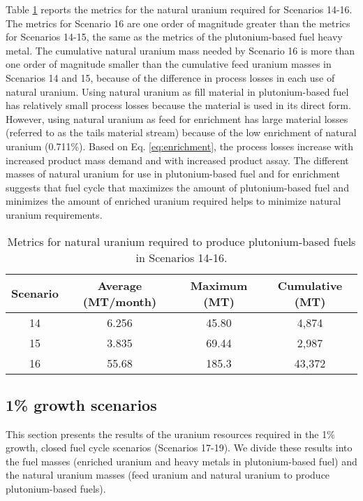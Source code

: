 Table \ref{tab:s14-16_natU} reports the metrics for the natural uranium 
required for Scenarios 14-16. The metrics for Scenario 16 are one order 
of magnitude greater than the metrics for Scenarios 14-15, the same as 
the metrics of the plutonium-based fuel heavy metal. 
The cumulative natural uranium mass 
needed by Scenario 16 is more than one order of magnitude smaller than 
the cumulative feed uranium masses in Scenarios 14 and 15, because of the 
difference in process losses in each use of natural uranium. Using natural 
uranium as fill material in plutonium-based fuel has relatively small 
process losses because the material is used in its direct form. However, 
using natural uranium as feed for enrichment has large material losses 
(referred to as the tails material stream)
because of the low enrichment of natural uranium (0.711\%). Based on 
Eq. \ref{eq:enrichment}, the process losses increase with increased 
product mass demand and with increased product assay. The different 
masses of natural uranium for use in plutonium-based fuel and 
for enrichment suggests that fuel cycle that maximizes 
the amount of plutonium-based fuel and minimizes the amount of 
enriched uranium required helps to minimize natural uranium requirements. 

\begin{table}[h!]
    \centering 
    \caption{Metrics for natural uranium required to produce 
    plutonium-based fuels in Scenarios 14-16.}
    \label{tab:s14-16_natU}
    \begin{tabular}{c c c c}
        \hline 
        Scenario & Average (MT/month) & Maximum (MT) & Cumulative (MT) \\
        \hline 
        14 & 6.256 & 45.80 & 4,874 \\
        15 & 3.835 & 69.44 & 2,987 \\
        16 & 55.68 & 185.3 & 43,372 \\
        \hline
        
    \end{tabular}
\end{table}

\subsection{1\% growth scenarios}
This section presents the results of the uranium resources required 
in the 1\% growth, closed fuel cycle scenarios (Scenarios 17-19). 
We divide these results into the fuel masses (enriched uranium 
and heavy metals in plutonium-based fuel) and the natural 
uranium masses (feed uranium and natural uranium to produce 
plutonium-based fuels).

